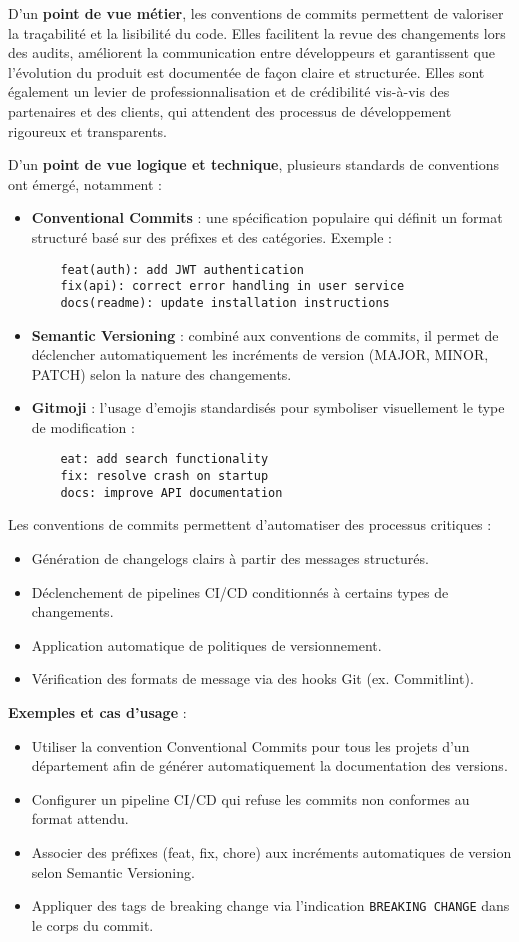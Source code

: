 D’un \textbf{point de vue métier}, les conventions de commits permettent de valoriser la traçabilité et la lisibilité du code. Elles facilitent la revue des changements lors des audits, améliorent la communication entre développeurs et garantissent que l’évolution du produit est documentée de façon claire et structurée. Elles sont également un levier de professionnalisation et de crédibilité vis-à-vis des partenaires et des clients, qui attendent des processus de développement rigoureux et transparents.

D’un \textbf{point de vue logique et technique}, plusieurs standards de conventions ont émergé, notamment :
\begin{itemize}
	\item \textbf{Conventional Commits} : une spécification populaire qui définit un format structuré basé sur des préfixes et des catégories. Exemple :
	      \begin{verbatim}
    feat(auth): add JWT authentication
    fix(api): correct error handling in user service
    docs(readme): update installation instructions
	      \end{verbatim}
	\item \textbf{Semantic Versioning} : combiné aux conventions de commits, il permet de déclencher automatiquement les incréments de version (MAJOR, MINOR, PATCH) selon la nature des changements.
	\item \textbf{Gitmoji} : l’usage d’emojis standardisés pour symboliser visuellement le type de modification :
	      \begin{verbatim}
    eat: add search functionality
    fix: resolve crash on startup
    docs: improve API documentation
	      \end{verbatim}
\end{itemize}

Les conventions de commits permettent d’automatiser des processus critiques :
\begin{itemize}
	\item Génération de changelogs clairs à partir des messages structurés.
	\item Déclenchement de pipelines CI/CD conditionnés à certains types de changements.
	\item Application automatique de politiques de versionnement.
	\item Vérification des formats de message via des hooks Git (ex. Commitlint).
\end{itemize}

\textbf{Exemples et cas d’usage} :
\begin{itemize}
	\item Utiliser la convention Conventional Commits pour tous les projets d’un département afin de générer automatiquement la documentation des versions.
	\item Configurer un pipeline CI/CD qui refuse les commits non conformes au format attendu.
	\item Associer des préfixes (feat, fix, chore) aux incréments automatiques de version selon Semantic Versioning.
	\item Appliquer des tags de breaking change via l’indication \texttt{BREAKING CHANGE} dans le corps du commit.
\end{itemize}


